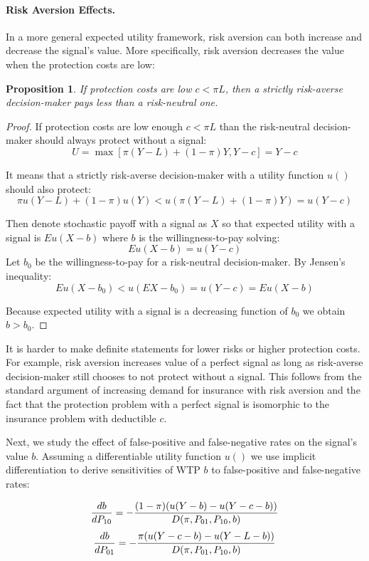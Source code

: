 \documentclass[12pt,a4paper]{article}
\newtheorem{theorem}{Proposition}
\begin{document}
\paragraph{Risk Aversion Effects.} In a more general expected utility framework, risk aversion can both increase and decrease the signal's value. More specifically, risk aversion decreases the value when the protection costs are low: 

\begin{theorem}
 If protection costs are low $c<\pi L$, then a strictly risk-averse decision-maker pays less than a risk-neutral one.
\end{theorem} 
\small
\begin{proof} If protection costs are low enough $c<\pi L$ than the risk-neutral decision-maker should always protect without a signal:
$$U=\max[\pi(Y-L)+(1-\pi)Y,Y-c]=Y-c$$

It means that a strictly risk-averse decision-maker with a utility function $u()$ should also protect:
$$\pi u(Y-L)+(1-\pi)u(Y)<u(\pi(Y-L)+(1-\pi)Y)=u(Y-c)$$

Then denote stochastic payoff with a signal as $X$ so that expected utility with a signal is $Eu(X-b)$ where $b$ is the willingness-to-pay solving:
$$Eu(X-b)=u(Y-c)$$
 Let $b_0$ be the willingness-to-pay for a risk-neutral decision-maker. By Jensen's inequality:
$$Eu(X-b_0)<u(EX-b_0)=u(Y-c)=Eu(X-b)$$

Because expected utility with a signal is a decreasing function of $b_0$ we obtain $b>b_0$. \end{proof} \normalsize
It is harder to make definite statements for lower risks or higher protection costs. For example, risk aversion increases value of a perfect signal as long as risk-averse decision-maker still chooses to not protect without a signal. This follows from the standard argument of increasing demand for insurance with risk aversion and the fact that the protection problem with a perfect signal is isomorphic to the insurance problem with deductible $c$. 

Next, we study the effect of false-positive and false-negative rates on the signal's value $b$. Assuming a differentiable utility function $u()$ we use implicit differentiation to derive sensitivities of WTP $b$ to false-positive and false-negative rates:

$${db\over dP_{10}}=-{(1-\pi)(u(Y-b)-u(Y-c-b))\over D(\pi, P_{01}, P_{10}, b)}$$
$${db\over dP_{01}}=-{\pi(u(Y-c-b)-u(Y-L-b))\over D(\pi, P_{01}, P_{10}, b)}$$
\end{document}
